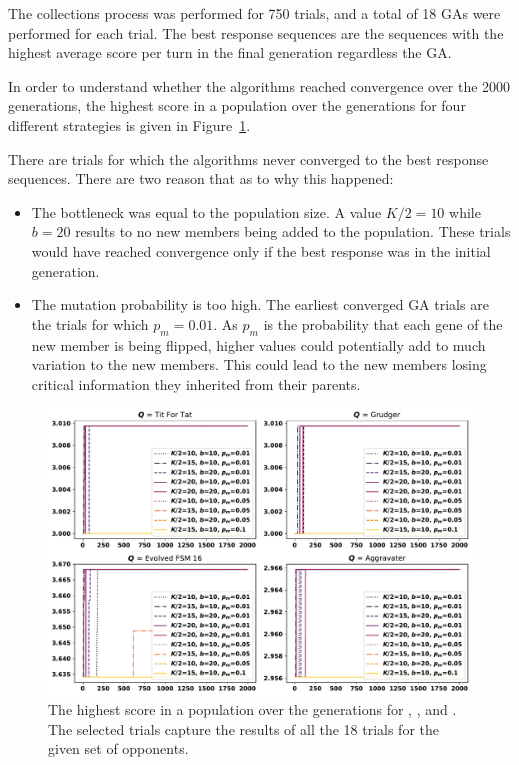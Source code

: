 The collections process was performed for 750 trials, and a total of 18 GAs were
performed for each trial. The best response sequences are the sequences with the
highest average score per turn in the final generation regardless the GA.

In order to understand whether the algorithms reached convergence over the
2000 generations, the highest score in a population over the generations for four
different strategies is given in Figure~\ref{fig:ga_trials}.

There are trials for which the algorithms never converged to the best response
sequences. There are two reason that as to why this happened:

\begin{itemize}
    \item The bottleneck was equal to the population size. A value $K/2=10$ while
    $b=20$ results to no new members being added to the population. These trials
    would have reached convergence only if the best response was in the initial
    generation.
    \item The mutation probability is too high. The earliest converged GA trials
    are the trials for which \(p_m=0.01\). As \(p_m\) is the probability that
    each gene of the new member is being flipped, higher values could potentially
    add to much variation to the new members. This could lead to the new members
    losing critical information they inherited from their parents.
\end{itemize}

\begin{figure}[!htbp]
    \centering
    \includegraphics[width=.9\textwidth]{src/chapters/06/img/gas_results_per_trial.pdf}
    \caption{The highest score in a population over the generations for \TitForTat,
    \Grudger, \FSMSixTeen and \Aggravater. The selected trials capture the results
    of all the 18 trials for the given set of opponents.}\label{fig:ga_trials}
\end{figure}

